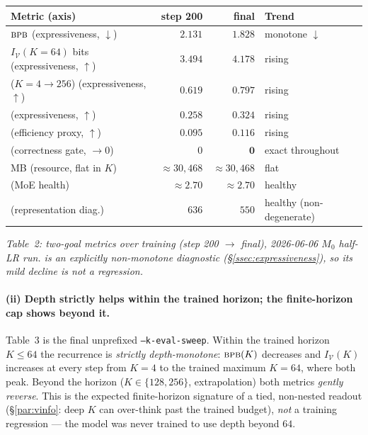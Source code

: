 \documentclass[11pt]{article}
\newcommand{\bpb}{\textsc{bpb}}
\newcommand{\code}[1]{\texttt{#1}}
\begin{document}
\begin{center}
\footnotesize
\renewcommand{\arraystretch}{1.15}
\setlength{\tabcolsep}{6pt}
\begin{tabularx}{\textwidth}{@{}L{0.40\textwidth} r r L{0.18\textwidth}@{}}
\toprule
\textbf{Metric (axis)} & \textbf{step 200} & \textbf{final} & \textbf{Trend} \\
\midrule
\(\bpb\) (expressiveness, \(\downarrow\))                                 & \(2.131\)  & \(\mathbf{1.828}\) & monotone \(\downarrow\) \\
\(I_{\mathcal V}(K{=}64)\) bits (expressiveness, \(\uparrow\))            & \(3.494\)  & \(\mathbf{4.178}\) & rising \\
\code{} (\(K{=}4{\to}256\)) (expressiveness, \(\uparrow\)) & \(0.619\) & \(\mathbf{0.797}\) & rising \\
\code{} (expressiveness, \(\uparrow\))          & \(0.258\)  & \(\mathbf{0.324}\) & rising \\
\code{} (efficiency proxy, \(\uparrow\))             & \(0.095\)  & \(\mathbf{0.116}\) & rising \\
\code{} (correctness gate, \(\to0\))               & \(0\)      & \(\mathbf{0}\)     & exact throughout \\
\code{} MB (resource, flat in \(K\))               & \(\approx30{,}468\) & \(\approx30{,}468\) & flat \\
\code{} (MoE health)                             & \(\approx2.70\) & \(\approx2.70\) & healthy \\
\code{} (representation diag.)                         & \(636\)    & \(550\)            & healthy (non-degenerate) \\
\bottomrule
\end{tabularx}

\smallskip
\emph{Table~2: two-goal metrics over training (step 200 \(\to\) final), 2026-06-06 \(M_0\) half-LR
run.  \code{} is an explicitly non-monotone diagnostic (\S\ref{ssec:expressiveness}),
so its mild decline is not a regression.}
\end{center}

\paragraph{(ii) Depth strictly helps within the trained horizon; the finite-horizon cap shows beyond it.}
Table~3 is the final unprefixed \code{--k-eval-sweep}.  Within the trained horizon \(K\le64\) the
recurrence is \emph{strictly depth-monotone}: \(\bpb(K)\) decreases and \(I_{\mathcal V}(K)\) increases
at every step from \(K{=}4\) to the trained maximum \(K{=}64\), where both peak.  Beyond the horizon
(\(K\in\{128,256\}\), extrapolation) both metrics \emph{gently reverse}.  This is the expected
finite-horizon signature of a tied, non-nested readout (\S\ref{par:vinfo}: deep \(K\) can over-think
past the trained budget), \emph{not} a training regression --- the model was never trained to use depth
beyond \(64\).
\end{document}
